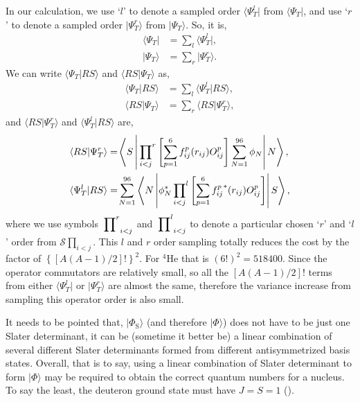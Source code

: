 \documentclass[12pt,letterpaper,UTF8]{report}
\begin{document}
In our calculation, we use `$l$' to denote a sampled order $\langle \Psi^l_T |$ from $\langle \Psi_T |$, and use `$r$' to denote a sampled order $| \Psi^r_T \rangle$ from $| \Psi_T \rangle$. So, it is,
\begin{align}
\langle \Psi_T | & = \sum  _l\langle \Psi^l_T |,  \\
| \Psi_T \rangle &= \sum_r | \Psi^r_T \rangle.
\end{align}
We can write $\langle \Psi_T | RS\rangle$ and $\langle RS | \Psi_T \rangle$ as,
\begin{align}
\langle \Psi_T | RS \rangle &= \sum  _l\langle \Psi^l_T |  RS \rangle , \label{lorderdef}\\
\langle RS | \Psi_T \rangle &= \sum_r \langle RS | \Psi^r_T \rangle, \label{rorderdef}
\end{align}
and $\langle R S | \Psi_T^r  \rangle$ and $\langle \Psi_T^l | R S \rangle$  are,
\begin{align}
\langle R S | \Psi_T^r  \rangle &= \!
\left\langle S \left|
\sideset{}{^r}
 \prod_{i<j}
\left[
\sum_{p=1}^6   f_{ij}^p (r_{ij})  O_{ij}^p
\right]
\sum_{N=1}^{96} \phi_N
\right| N \right\rangle
, \label{RSPsiTr} \\
\! \! \! \! \! \!  \langle \Psi_T^l | R S \rangle &= \!
 \sum_{N=1}^{96} \left\langle N \left|\phi^*_N
\sideset{}{^l} \prod_{i<j}
\left[
\sum_{p=1}^6  {f_{ij}^p}^* (r_{ij})   O_{ij}^p
\right]
\right| S \right\rangle ,\label{RSPsiTl}
\end{align}
where we use symbols $\sideset{}{^r} \prod_{i<j}$ and $\sideset{}{^l} \prod_{i<j}$ to denote a particular chosen `$r$' and `$l$' order from $ {\mathcal S} \prod_{i<j}$.
This $l$ and $r$ order sampling totally reduces the cost by the factor of $\left\{[A(A-1)/2]!\right\}^2$. For $^4$He that is $(6!)^2=518400$.
Since the operator commutators are relatively small, so all the $[A(A-1)/2]!$ terms from either $\langle \Psi^l_T |$ or $| \Psi^r_T \rangle$ are almost the same, therefore the variance increase from sampling this operator order is also small.

It needs to be pointed that, $|\Phi_\textrm{S} \rangle $ (and therefore $|\Phi \rangle $) does not have to be just one Slater determinant, it can be (sometime it better be) a linear combination of several different Slater determinants formed from different antisymmetrized basis states. Overall, that is to say, using a linear combination of Slater determinant to form $| \Phi \rangle$ may be required to obtain the correct quantum numbers for a nucleus. To say the least, the deuteron ground state must have $J=S=1$ (\cite{SiemensJensenbook}).
\end{document}
